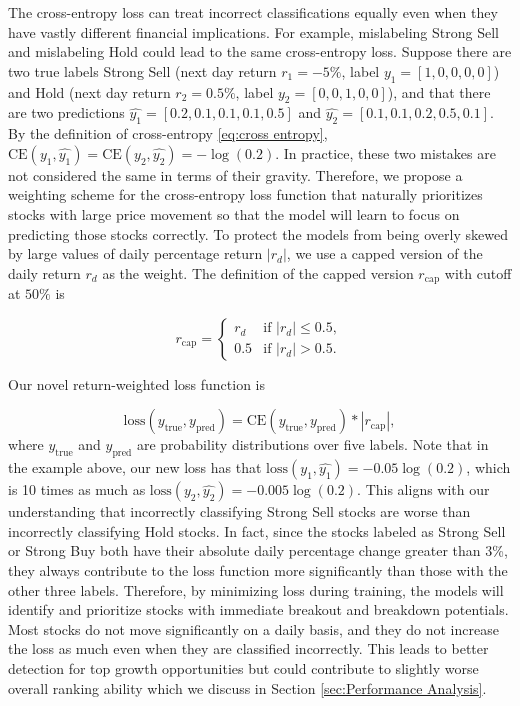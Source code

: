 \documentclass[preprint,12pt,numafflabel,authoryear]{elsarticle}
\begin{document}
The cross-entropy loss can treat incorrect classifications equally even when they have vastly different financial implications. For example, mislabeling Strong Sell and mislabeling Hold could lead to the same cross-entropy loss. Suppose there are two true labels Strong Sell (next day return $r_1=-5\%$, label $y_1=[1,0,0,0,0]$) and Hold (next day return $r_2=0.5\%$, label $y_2=[0,0,1,0,0]$), and that there are two predictions $\hat{y_1}=[0.2, 0.1, 0.1, 0.1, 0.5]$ and $\hat{y_2}=[0.1, 0.1, 0.2, 0.5, 0.1]$. By the definition of cross-entropy \eqref{eq:cross entropy}, $\text{CE}(y_1, \hat{y_1}) = \text{CE}(y_2, \hat{y_2}) = -\log (0.2)$. In practice, these two mistakes are not considered the same in terms of their gravity. Therefore, we propose a weighting scheme for the cross-entropy loss function that naturally prioritizes stocks with large price movement so that the model will learn to focus on predicting those stocks correctly. To protect the models from being overly skewed by large values of daily percentage return $|r_d|$, we use a capped version of the daily return $r_d$ as the weight. The definition of the capped version $r_{\text{cap}}$ with cutoff at $50\%$ is

\begin{equation}
\label{eq:r_cap}
r_{\text{cap}} = \begin{cases} 
r_d & \text{if } |r_d| \leq 0.5, \\
0.5 & \text{if } |r_d| > 0.5.
\end{cases}
\end{equation}

Our novel return-weighted loss function is 

\begin{equation}
\label{eq:loss function}
\mathrm{loss}(y_{\text{true}}, y_{\text{pred}}) = \mathrm{CE}(y_{\text{true}}, y_{\text{pred}}) * |r_{\text{cap}}|,
\end{equation}
where $y_{\text{true}}$ and $y_{\text{pred}}$ are probability distributions over five labels. Note that in the example above, our new loss has that $\text{loss}(y_1,\hat{y_1})=-0.05\log(0.2)$, which is 10 times as much as $\text{loss}(y_2,\hat{y_2})=-0.005\log(0.2)$. This aligns with our understanding that incorrectly classifying Strong Sell stocks are worse than incorrectly classifying Hold stocks. In fact, since the stocks labeled as Strong Sell or Strong Buy both have their absolute daily percentage change greater than 3\%, they always contribute to the loss function more significantly than those with the other three labels. Therefore, by minimizing loss during training, the models will identify and prioritize stocks with immediate breakout and breakdown potentials. Most stocks do not move significantly on a daily basis, and they do not increase the loss as much even when they are classified incorrectly. This leads to better detection for top growth opportunities but could contribute to slightly worse overall ranking ability which we discuss in Section \ref{sec:Performance Analysis}.
\end{document}
